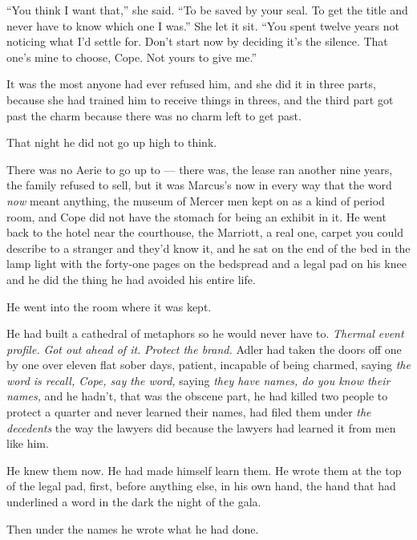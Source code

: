 \documentclass[11pt,openany]{book}
\newcommand{\scenebreak}{\par\vspace{0.5\baselineskip}\begin{center}\textasteriskcentered\quad\textasteriskcentered\quad\textasteriskcentered\end{center}\vspace{0.5\baselineskip}\par}
\begin{document}
``You think I want that,'' she said. ``To be saved by your seal. To get the title and never have to know which one I was.'' She let it sit. ``You spent twelve years not noticing what I'd settle for. Don't start now by deciding it's the silence. That one's mine to choose, Cope. Not yours to give me.''

It was the most anyone had ever refused him, and she did it in three parts, because she had trained him to receive things in threes, and the third part got past the charm because there was no charm left to get past.


\scenebreak


That night he did not go up high to think.

There was no Aerie to go up to --- there was, the lease ran another nine years, the family refused to sell, but it was Marcus's now in every way that the word \textit{now} meant anything, the museum of Mercer men kept on as a kind of period room, and Cope did not have the stomach for being an exhibit in it. He went back to the hotel near the courthouse, the Marriott, a real one, carpet you could describe to a stranger and they'd know it, and he sat on the end of the bed in the lamp light with the forty-one pages on the bedspread and a legal pad on his knee and he did the thing he had avoided his entire life.

He went into the room where it was kept.

He had built a cathedral of metaphors so he would never have to. \textit{Thermal event profile.} \textit{Got out ahead of it.} \textit{Protect the brand.} Adler had taken the doors off one by one over eleven flat sober days, patient, incapable of being charmed, saying \textit{the word is recall, Cope, say the word,} saying \textit{they have names, do you know their names,} and he hadn't, that was the obscene part, he had killed two people to protect a quarter and never learned their names, had filed them under \textit{the decedents} the way the lawyers did because the lawyers had learned it from men like him.

He knew them now. He had made himself learn them. He wrote them at the top of the legal pad, first, before anything else, in his own hand, the hand that had underlined a word in the dark the night of the gala.

Then under the names he wrote what he had done.
\end{document}
